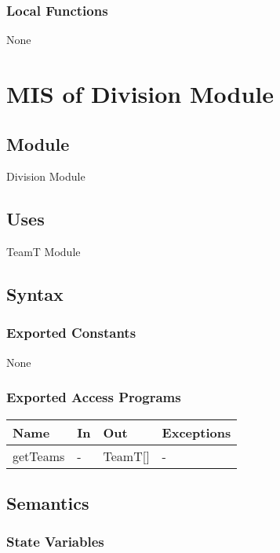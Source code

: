 \documentclass[12pt, titlepage]{article}
\begin{document}
\subsubsection{Local Functions}
None

\newpage

\section{MIS of Division Module} \label{Division}

\subsection{Module}

Division Module

\subsection{Uses}
TeamT Module

\subsection{Syntax}

\subsubsection{Exported Constants}
None

\subsubsection{Exported Access Programs}

\begin{center}
  \begin{tabular}{p{2cm} p{4cm} p{4cm} p{2cm}}
    \hline
    \textbf{Name}    & \textbf{In} & \textbf{Out} & \textbf{Exceptions} \\
    \hline
    getTeams & -           & TeamT[]            & -                   \\
    \hline
  \end{tabular}
\end{center}

\subsection{Semantics}

\subsubsection{State Variables}
\end{document}
